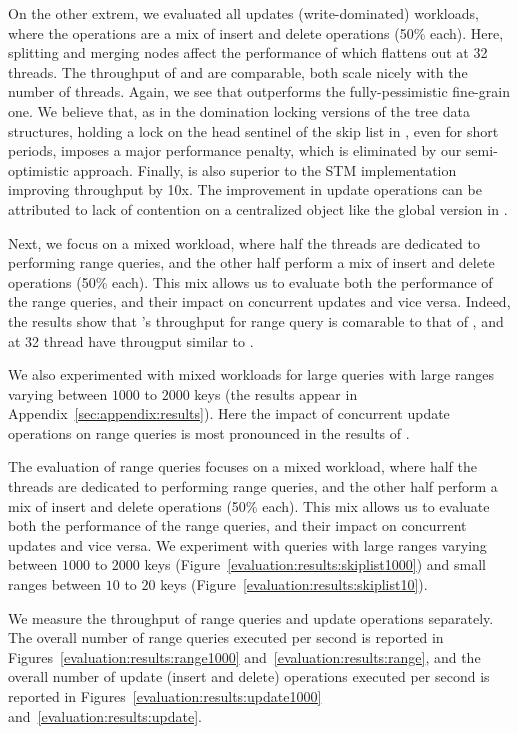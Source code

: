 On the other extrem, we evaluated all updates (write-dominated) workloads, where the operations are a mix of insert and delete operations (50\% each). Here, splitting and merging nodes affect the performance of \kary which flattens out at 32 threads. The throughput of \autoSkiplist and \stmSkiplist are comparable, both scale nicely with the number of threads.
Again, we see that \autoSkiplist outperforms
the fully-pessimistic fine-grain one. We believe that,
as in the
domination locking versions of the tree data structures, holding a lock on the head sentinel of the skip list in
\domSkiplist, even for short periods, imposes a major performance penalty,
which is eliminated by our semi-optimistic approach. 
Finally, \autoSkiplist is also superior to the STM implementation
improving throughput by
10x. The improvement in update operations can be attributed to lack of contention on a centralized object like the global version in \stmSkiplist.

Next, we focus on a mixed workload, where half the
threads are dedicated to performing range queries, and the other half perform a
mix of insert and delete operations (50\% each).
This mix allows us to evaluate both the performance of the range queries,
and their impact on concurrent updates and vice versa.
Indeed, the results show that \kary's throughput for range query is comarable to that of \skiplist, and at 32 thread have througput similar to \autoSkiplist.

We also experimented with mixed workloads for large queries with large ranges varying between $1000$ to $2000$ keys (the results appear in Appendix~\ref{sec:appendix:results}). Here the impact of concurrent update operations on range queries is most pronounced in the results of \kary.


The evaluation of range queries focuses on a mixed workload, where half the
threads are dedicated to performing range queries, and the other half perform a
mix of insert and delete operations (50\% each).
This mix allows us to evaluate both the performance of the range queries,
and their impact on concurrent updates and vice versa.
We experiment with queries with large ranges varying between $1000$ to $2000$ keys
(Figure~\ref{evaluation:results:skiplist1000}) and small ranges
between $10$ to $20$
keys (Figure~\ref{evaluation:results:skiplist10}).

We measure the throughput of range queries and update operations separately.
The overall number of range queries executed per second is reported
in Figures~\ref{evaluation:results:range1000}
and~\ref{evaluation:results:range}, and the overall number of update (insert
and delete) operations executed per second is reported in
Figures~\ref{evaluation:results:update1000} and~\ref{evaluation:results:update}.

